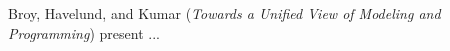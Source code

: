 

Broy, Havelund, and Kumar
\cite{isola-2016-broy}
({\em Towards a Unified View of Modeling and Programming})
present ...
